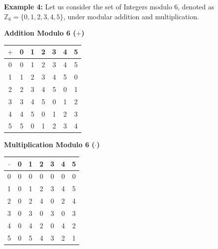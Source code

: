 \documentclass[11pt, a4paper]{article}
\begin{document}
	\vspace{0.5em}
	
	\noindent \textbf{Example 4:} Let us consider the set of Integers modulo 6, denoted as $\mathbb{Z}_6 = \{0, 1, 2, 3, 4, 5\}$, under modular addition and multiplication.
	
	\begin{center}
		\begin{minipage}[t]{0.45\textwidth}
			\centering
			\textbf{Addition Modulo 6 ($+$)} \\[0.5em]
			\begin{tabular}{c|cccccc}
				$+$ & 0 & 1 & 2 & 3 & 4 & 5 \\ \hline
				0   & 0 & 1 & 2 & 3 & 4 & 5 \\
				1   & 1 & 2 & 3 & 4 & 5 & 0 \\
				2   & 2 & 3 & 4 & 5 & 0 & 1 \\
				3   & 3 & 4 & 5 & 0 & 1 & 2 \\
				4   & 4 & 5 & 0 & 1 & 2 & 3 \\
				5   & 5 & 0 & 1 & 2 & 3 & 4 \\
			\end{tabular}
		\end{minipage}
		\hfill %
		\begin{minipage}[t]{0.45\textwidth}
			\centering
			\textbf{Multiplication Modulo 6 ($\cdot$)} \\[0.5em]
			\begin{tabular}{c|cccccc}
				$\cdot$ & 0 & 1 & 2 & 3 & 4 & 5 \\ \hline
				0       & 0 & 0 & 0 & 0 & 0 & 0 \\
				1       & 0 & 1 & 2 & 3 & 4 & 5 \\
				2       & 0 & 2 & 4 & 0 & 2 & 4 \\
				3       & 0 & 3 & 0 & 3 & 0 & 3 \\
				4       & 0 & 4 & 2 & 0 & 4 & 2 \\
				5       & 0 & 5 & 4 & 3 & 2 & 1 \\
			\end{tabular}
		\end{minipage}
	\end{center}
	
\end{document}

